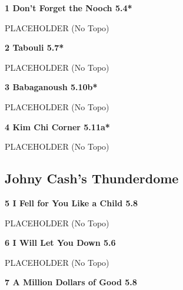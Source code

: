 \begin{multicols}{2}
			\label{rt:Don't Forget the Nooch}
\colorbox{green!20}{
\parbox{0.95\linewidth}{
\textbf{
1 Don't Forget the Nooch 5.4*  
}
}
}

			\begin{adjustwidth}{0.5cm}{}				
			PLACEHOLDER
				\newline (No Topo) 
			\end{adjustwidth}
			\label{rt:Tabouli}
\colorbox{green!20}{
\parbox{0.95\linewidth}{
\textbf{
2 Tabouli 5.7*  
}
}
}

			\begin{adjustwidth}{0.5cm}{}				
			PLACEHOLDER
				\newline (No Topo) 
			\end{adjustwidth}
			\label{rt:Babaganoush}
\colorbox{RoyalBlue!20}{
\parbox{0.95\linewidth}{
\textbf{
3 Babaganoush 5.10b*  
}
}
}

			\begin{adjustwidth}{0.5cm}{}				
			PLACEHOLDER
				\newline (No Topo) 
			\end{adjustwidth}
			\label{rt:Kim Chi Corner}
\colorbox{RoyalBlue!20}{
\parbox{0.95\linewidth}{
\textbf{
4 Kim Chi Corner 5.11a*  
}
}
}

			\begin{adjustwidth}{0.5cm}{}				
			PLACEHOLDER
				\newline (No Topo) 
			\end{adjustwidth}
		\subsection*{Johny Cash's Thunderdome}\label{bf:Johny Cash's Thunderdome}
			
			\label{rt:I Fell for You Like a Child}
\colorbox{green!20}{
\parbox{0.95\linewidth}{
\textbf{
5 I Fell for You Like a Child 5.8  
}
}
}

			\begin{adjustwidth}{0.5cm}{}				
			PLACEHOLDER
				\newline (No Topo) 
			\end{adjustwidth}
			\label{rt:I Will Let You Down}
\colorbox{green!20}{
\parbox{0.95\linewidth}{
\textbf{
6 I Will Let You Down 5.6  
}
}
}

			\begin{adjustwidth}{0.5cm}{}				
			PLACEHOLDER
				\newline (No Topo) 
			\end{adjustwidth}
			\label{rt:A Million Dollars of Good}
\colorbox{green!20}{
\parbox{0.95\linewidth}{
\textbf{
7 A Million Dollars of Good 5.8  
}
}
}


\end{multicols}
